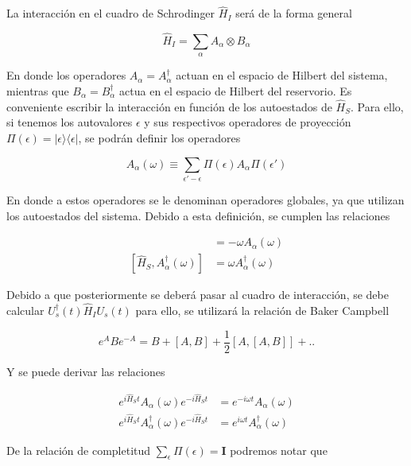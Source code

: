 La interacción en el cuadro de Schrodinger $\hat{H}_{I}$ será de la forma general

\begin{equation*}
    \hat{H}_{I} = \sum_{\alpha}A_{\alpha} \otimes B_{\alpha}
\end{equation*}

En donde los operadores $A_{\alpha} = A^{\dagger}_{\alpha}$ actuan en el espacio de Hilbert del sistema, mientras que $B_{\alpha}=B^{\dagger}_{\alpha}$ actua en el espacio de Hilbert del reservorio. Es conveniente escribir la interacción en función de los autoestados de $\hat{H}_{S}$. Para ello, si tenemos los autovalores $\epsilon$ y sus respectivos operadores de proyección $\Pi(\epsilon) = |\epsilon\rangle \langle \epsilon|$, se podrán definir los operadores

\begin{equation*}
    A_{\alpha}(\omega) \equiv \sum_{\epsilon' - \epsilon}\Pi(\epsilon)A_{\alpha}\Pi(\epsilon') 
\end{equation*}

En donde a estos operadores se le denominan operadores globales, ya que utilizan los autoestados del sistema. Debido a esta definición, se cumplen las relaciones

\begin{align*}
    [\hat{H}_{S},A_{\alpha}(\omega)] & = - \omega A_{\alpha}(\omega) \\
    [\hat{H}_{S},A^{\dagger}_{\alpha}(\omega)] & = \omega A^{\dagger}_{\alpha}(\omega)
\end{align*}

Debido a que posteriormente se deberá pasar al cuadro de interacción, se debe calcular $U^{\dagger}_{s}(t)\hat{H}_{I}U_{s}(t)$ para ello, se utilizará la relación de Baker Campbell

\begin{equation}
    e^{A}Be^{-A} = B  + [A,B] + \frac{1}{2}[A,[A,B]] +..
    \label{sec2lind:baker}
\end{equation}

Y se puede derivar las relaciones 

\begin{align*}
    e^{i\hat{H}_{S}t}A_{\alpha}(\omega) e^{-i\hat{H}_{S}t} & = e^{-i\omega t} A_{\alpha}(\omega) \\
    e^{i\hat{H}_{S}t}A^{\dagger}_{\alpha}(\omega) e^{-i\hat{H}_{S}t} & = e^{i\omega t} A^{\dagger}_{\alpha}(\omega)
\end{align*}

De la relación de completitud $\sum_{\epsilon}\Pi(\epsilon) = \mathbf{I}$ podremos notar que

